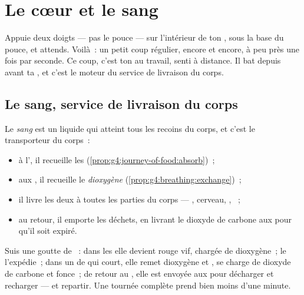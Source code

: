 \chapter{Le cœur et le sang}\label{ch:g4:heart-and-blood}

Appuie deux doigts --- pas le pouce --- sur l'intérieur de ton
, sous la base du pouce, et attends. Voilà~: un petit coup
régulier, encore et encore, à peu près une fois par seconde. Ce coup,
c'est ton  au travail, senti à distance. Il bat depuis avant ta
, et c'est le moteur du service de livraison du corps.

\section{Le sang, service de livraison du corps}

\begin{proposition}\label{prop:g4:heart-and-blood:carries}
Le \emph{sang} est un liquide qui atteint tous les
recoins du corps, et c'est le transporteur du corps~:
\begin{itemize}
  \item à l', il recueille les \emph{}
        (\cref{prop:g4:journey-of-food:absorb})~;
  \item aux , il recueille le \emph{dioxygène}
        (\cref{prop:g4:breathing:exchange})~;
  \item il livre les deux à toutes les parties du corps ---
        , cerveau, , ~;
  \item au retour, il emporte les déchets, en livrant le dioxyde de
        carbone aux  pour qu'il soit expiré.
\end{itemize}
\end{proposition}
\admitted

\begin{example}\label{ex:g4:heart-and-blood:round}
Suis une goutte de ~: dans les  elle devient rouge vif,
chargée de dioxygène~; le  l'expédie~; dans un  de 
qui court, elle remet dioxygène et , se charge de dioxyde
de carbone et fonce~; de retour au , elle est envoyée aux 
pour décharger et recharger --- et repartir. Une tournée complète
prend bien moins d'une minute.
\end{example}

